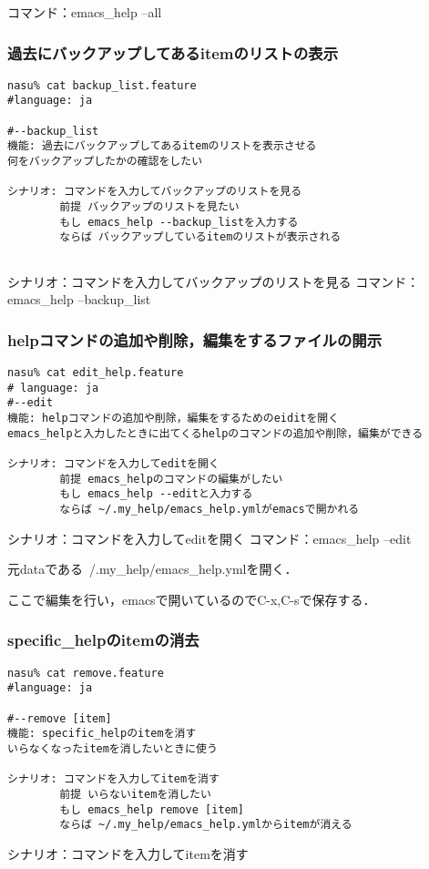 コマンド：emacs\_help --all

\subsubsection{過去にバックアップしてあるitemのリストの表示}\begin{lstlisting}[style=customRuby,basicstyle={\scriptsize\ttfamily}]
nasu% cat backup_list.feature
#language: ja

#--backup_list
機能: 過去にバックアップしてあるitemのリストを表示させる
何をバックアップしたかの確認をしたい

シナリオ: コマンドを入力してバックアップのリストを見る
        前提 バックアップのリストを見たい
        もし emacs_help --backup_listを入力する
        ならば バックアップしているitemのリストが表示される
        
\end{lstlisting}
シナリオ：コマンドを入力してバックアップのリストを見る
コマンド：emacs\_help --backup\_list

\subsubsection{helpコマンドの追加や削除，編集をするファイルの開示}\begin{lstlisting}[style=customRuby,basicstyle={\scriptsize\ttfamily}]
nasu% cat edit_help.feature
# language: ja
#--edit
機能: helpコマンドの追加や削除，編集をするためのeiditを開く
emacs_helpと入力したときに出てくるhelpのコマンドの追加や削除，編集ができる

シナリオ: コマンドを入力してeditを開く
        前提 emacs_helpのコマンドの編集がしたい
        もし emacs_help --editと入力する
        ならば ~/.my_help/emacs_help.ymlがemacsで開かれる
\end{lstlisting}
シナリオ：コマンドを入力してeditを開く
コマンド：emacs\_help --edit

元dataである~/.my\_help/emacs\_help.ymlを開く．

ここで編集を行い，emacsで開いているのでC-x,C-sで保存する．

\subsubsection{specific\_helpのitemの消去}\begin{lstlisting}[style=customRuby,basicstyle={\scriptsize\ttfamily}]
nasu% cat remove.feature
#language: ja

#--remove [item]
機能: specific_helpのitemを消す
いらなくなったitemを消したいときに使う

シナリオ: コマンドを入力してitemを消す
        前提 いらないitemを消したい
        もし emacs_help remove [item]
        ならば ~/.my_help/emacs_help.ymlからitemが消える

\end{lstlisting}
シナリオ：コマンドを入力してitemを消す

